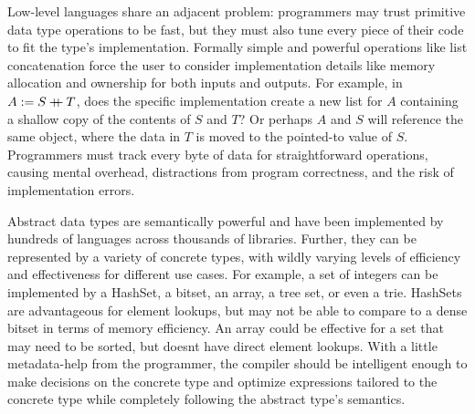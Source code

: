 \documentclass{article}
\newcommand{\concat}{%
  \mathbin{{+}\mspace{-8mu}{+}}%
}
\begin{document}
Low-level languages share an adjacent problem: programmers may trust primitive data type operations to be fast, but they must also tune every piece of their code to fit the type's implementation. Formally simple and powerful operations like list concatenation force the user to consider implementation details like memory allocation and ownership for both inputs and outputs. For example, in $A := S \concat T$, does the specific implementation create a new list for $A$ containing a shallow copy of the contents of $S$ and $T$? Or perhaps $A$ and $S$ will reference the same object, where the data in $T$ is moved to the pointed-to value of $S$. Programmers must track every byte of data for straightforward operations, causing mental overhead, distractions from program correctness, and the risk of implementation errors.

Abstract data types are semantically powerful and have been implemented by hundreds of languages across thousands of libraries. Further, they can be represented by a variety of concrete types, with wildly varying levels of efficiency and effectiveness for different use cases. For example, a set of integers can be implemented by a HashSet, a bitset, an array, a tree set, or even a trie. HashSets are advantageous for element lookups, but may not be able to compare to a dense bitset in terms of memory efficiency. An array could be effective for a set that may need to be sorted, but doesnt have direct element lookups. With a little metadata-help from the programmer, the compiler should be intelligent enough to make decisions on the concrete type and optimize expressions tailored to the concrete type while completely following the abstract type's semantics.
\end{document}
